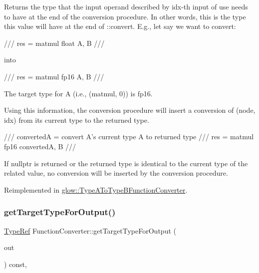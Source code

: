 \begin{DoxyReturn}{Returns}
the type that the input operand described by {\ttfamily idx-\/th} input of {\ttfamily use} needs to have at the end of the conversion procedure. In other words, this is the type this value will have at the end of \+::convert. E.\+g., let say we want to convert\+: \begin{DoxyVerb}/// res = matmul float A, B
/// \end{DoxyVerb}
 into \begin{DoxyVerb}/// res = matmul fp16 A, B
/// \end{DoxyVerb}
 The target type for A (i.\+e., (matmul, 0)) is fp16.
\end{DoxyReturn}
Using this information, the conversion procedure will insert a conversion of ({\ttfamily node}, {\ttfamily idx}) from its current type to the returned type. \begin{DoxyVerb}/// convertedA = convert A's current type A to returned type
/// res = matmul fp16 convertedA, B
/// \end{DoxyVerb}
 \begin{DoxyVerb}If nullptr is returned or the returned type is identical to the current
type of the related value, no conversion will be inserted by the
conversion procedure.  \end{DoxyVerb}
 

Reimplemented in \hyperlink{classglow_1_1_type_a_to_type_b_function_converter_a19c5372966cc435b4043c0b9f7f014b8}{glow\+::\+Type\+A\+To\+Type\+B\+Function\+Converter}.

\mbox{\label{classglow_1_1_function_converter_a015dfed23796395ce34c7ca4766c7854}} 
\subsubsection{\texorpdfstring{get\+Target\+Type\+For\+Output()}{getTargetTypeForOutput()}}
{\footnotesize\ttfamily \hyperlink{structglow_1_1_type}{Type\+Ref} Function\+Converter\+::get\+Target\+Type\+For\+Output (\begin{DoxyParamCaption}\item[{const \hyperlink{structglow_1_1_node_value}{Node\+Value} \&}]{out }\end{DoxyParamCaption}) const\hspace{0.3cm}{\ttfamily [protected]}, {\ttfamily [virtual]}}

